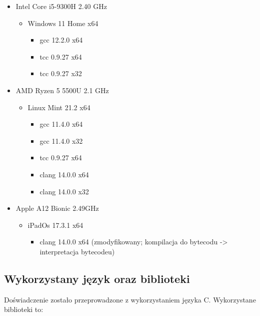 \documentclass{article}
\begin{document}
\begin{itemize}

\item Intel Core i5-9300H 2.40 GHz

\begin{itemize}

\item Windows 11 Home x64

\begin{itemize}
\item gcc 12.2.0 x64
\item tcc 0.9.27 x64
\item tcc 0.9.27 x32
\end{itemize}

\end{itemize}

\item AMD Ryzen 5 5500U 2.1 GHz

\begin{itemize}
\item Linux Mint 21.2 x64
\begin{itemize}
\item gcc 11.4.0 x64
\item gcc 11.4.0 x32
\item tcc 0.9.27 x64
\item clang 14.0.0 x64
\item clang 14.0.0 x32
\end{itemize}
\end{itemize}

\item Apple A12 Bionic 2.49GHz

\begin{itemize}
\item iPadOs 17.3.1 x64

\begin{itemize}
\item clang 14.0.0 x64 (zmodyfikowany; kompilacja do bytecodu -> interpretacja bytecodeu)
\end{itemize}

\end{itemize}

\end{itemize}

\subsection{Wykorzystany język oraz biblioteki}

Doświadczenie zostało przeprowadzone z wykorzystaniem języka C. Wykorzystane biblioteki to:
\end{document}
